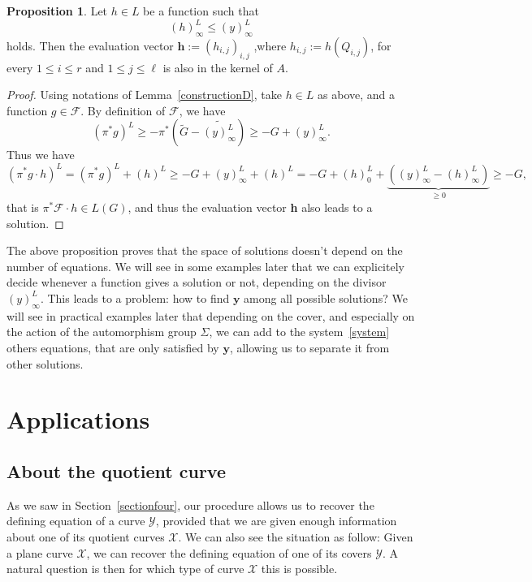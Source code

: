 \documentclass[10pt]{article}
\theoremstyle{definition}
\newtheorem{prop1}[thm]{Proposition}
\theoremstyle{definition}
\theoremstyle{definition}
\newcommand{\s}{\vspace{0.3cm}}
\newcommand{\cd}{\cdot}
\newcommand{\X}{\mathcal{X}}
\newcommand{\Y}{\mathcal{Y}}
\begin{document}
\begin{prop1} \label{othersolutions}
Let $h \in L$ be a function such that 
\[ (h)^L_{\infty} \leq (y)^L_{\infty}\]
holds. Then the evaluation vector $\mathbf{h}  := (h_{i,j})_{i,j}$ ,where $h_{i,j} := h(Q_{i,j})$, for every $1 \leq i \leq r$ and $1 \leq j \leq \ell$ is also in the kernel of $A$.
\end{prop1}

\s

\begin{proof}
Using notations of Lemma~\ref{constructionD}, take $h \in L$ as above, and a function $g \in \mathcal{F}$. By definition of $\mathcal{F}$, we have 
\[(\pi^*g)^L \geq -\pi^*\left(\tilde{G}-\widetilde{(y)^L_{\infty}}\right) \geq - G + (y)^L_{\infty}.\]
Thus we have 
\[(\pi^*g \cd h)^L = (\pi^*g)^L  + (h)^L \geq -G + (y)^L_{\infty}+(h)^L = -G + (h)^L_0 + \underbrace{((y)^L_{\infty}-(h)^L_{\infty})}_{\geq 0} \geq -G,\]
that is $\pi^*\mathcal{F}\cd h \in L(G)$, and thus the evaluation vector \textbf{h} also leads to a solution.

\end{proof}

\s

The above proposition proves that the space of solutions doesn't depend on the number of equations. 
We will see in some examples later that we can explicitely decide whenever a function gives a solution or not, depending on the divisor $(y)^L_{\infty}$. This leads to a problem: how to find $\mathbf{y}$ among all possible solutions? We will see in practical examples later that depending on the cover, and especially on the action of the automorphism group $\Sigma$,  we can add to the system~\eqref{system} others equations, that are only satisfied by $\mathbf{y}$, allowing us to separate it from other solutions.

\s
\section{Applications}

\s

\subsection{About the quotient curve}

\s


As we saw in Section~\ref{sectionfour}, our procedure allows us to recover the defining equation of a curve $\Y$, provided that we are given enough information about one of its quotient curves $\X$. We can also see the situation as follow: Given a plane curve $\X$, we can recover the defining equation of one of its covers $\Y$. A natural question is then for which type of curve $\X$ this is possible. 
\end{document}
